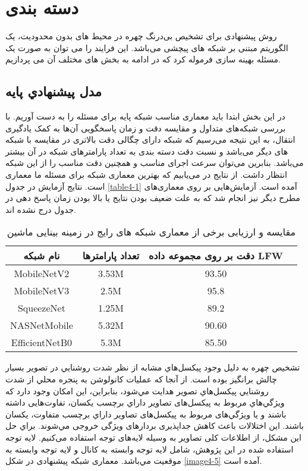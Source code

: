 \section{دسته بندی}
روش پیشنهادی برای تشخیص بی‌درنگ چهره در محیط های بدون محدودیت، یک الگوریتم مبتنی بر شبکه های پیچشی می‌باشد. این فرایند را می توان به صورت یک مسئله بهینه سازی فرموله کرد که در ادامه به بخش های مختلف آن می پردازیم.

\subsection{مدل پيشنهادي پايه}
در این بخش ابتدا باید معماری مناسب شبکه پایه برای مسئله را به دست آوریم. با بررسی شبکه‌های متداول و مقایسه دقت و زمان پاسخگویی آن‌ها به کمک یادگیری انتقال، به این نتیجه می‌رسیم که شبکه  دارای چگالی دقت بالاتری در مقایسه با شبکه های دیگر می‌باشد و نسبت دقت دسته بندی به تعداد پارامترهای شبکه در آن‌ بیشتر می‌باشد. بنابرین می‌توان سرعت اجرای مناسب و همچنین دقت مناسب را از این شبکه‌ انتظار داشت. از نتایج در می‌یابیم که بهترین معماری شبکه برای مسئله ما معماری  است. نتایج آزمایش در جدول \ref{table4-1} آمده است. آزمایش‌هایی بر روی معماری‌های مطرح دیگر نیز انجام شد که به علت ضعیف بودن نتایج یا بالا بودن زمان پاسخ دهی در جدول درج نشده اند.
\begin{table}[ht]
\label{table:5-1}
\begin{center}
\caption{مقایسه و ‌ارزیابی برخی از معماری شبکه های رایج در زمینه بینایی ماشین}
\resizebox{\textwidth}{!}
{
\begin{tabular}{|c|c|c|c|}
\hline 
نام شبکه & تعداد پارامترها & دقت بر روی مجموعه داده LFW
\\
\hline 
MobileNetV2 & 3.53M & 93.50
 \\
\hline
MobileNetV3 & 2.5M & 95.8 	 
\\
\hline
SqueezeNet & 1.25M & 89.2
\\
\hline 
NASNetMobile & 5.32M & 90.60
\\
\hline
EfficientNetB0 & 5.3M & 85.50
\\
\hline
\end{tabular}
}
\end{center} 
\end{table} 
\noindent
تشخيص چهره به دليل وجود پيكسل‌هاي مشابه از نظر شدت روشنايي در تصویر بسيار چالش برانگيز بوده است. از آنجا كه عمليات كانولوشن به پنجره محلي از شدت روشنايي پیکسل‌هاي تصوير هدايت مي‌شود، بنابراين، اين امكان وجود دارد كه ويژگي‌هاي مربوط به پیكسل‌های تصاویر داراي برچسب يكسان، تفاوت‌هايی داشته باشند و يا ويژگي‌های مربوط به پیكسل‌های تصاویر داراي برچسب متفاوت، يكسان باشند. اين اختلالات باعث کاهش جداپذیری بردارهای ویژگی خروجی مي‌شوند. براي حل اين مشكل، از اطلاعات كلی تصاوير به وسيله لايه‌های توجه استفاده می‌کنیم. لايه توجه استفاده شده در اين پژوهش، شامل لایه توجه وابسته به كانال و لایه توجه وابسته به موقعيت مي‌باشد. معماری شبکه پیشنهادی در شکل \ref{image4-5} آمده است.

